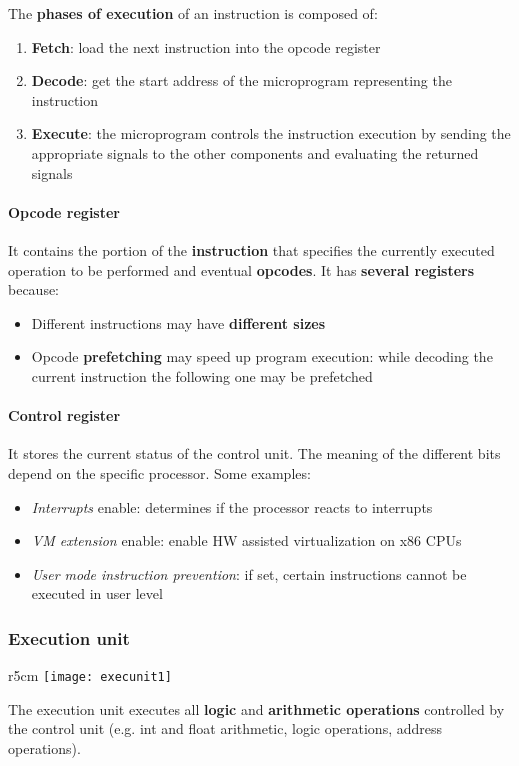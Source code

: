 \noindent The \textbf{phases of execution} of an instruction is composed of:
\begin{enumerate}
	\item \textbf{Fetch}: load the next instruction into the opcode register
	\item \textbf{Decode}: get the start address of the microprogram representing the instruction
	\item \textbf{Execute}: the microprogram controls the instruction execution by sending the appropriate signals to the other components and evaluating the returned signals
\end{enumerate}

\paragraph{Opcode register}
It contains the portion of the \textbf{instruction} that specifies the currently executed operation to be performed and eventual \textbf{opcodes}. It has \textbf{several registers} because:
\begin{itemize}
	\item Different instructions may have \textbf{different sizes}
	\item Opcode \textbf{prefetching} may speed up program execution: while decoding the current instruction the following one may be prefetched
\end{itemize}

\paragraph{Control register}
It stores the current status of the control unit. The meaning of the different bits depend on the specific processor. Some examples:
\begin{itemize}
	\item \textit{Interrupts} enable: determines if the processor reacts to interrupts
	\item \textit{VM extension} enable: enable HW assisted virtualization on x86 CPUs
	\item \textit{User mode instruction prevention}: if set, certain instructions cannot be executed in user level
\end{itemize}

\subsubsection{Execution unit}
\begin{wrapfigure}[8]{r}{5cm}
	\vspace{-0.5cm}
	\texttt{[image: execunit1]}
\end{wrapfigure}
The execution unit executes all \textbf{logic} and \textbf{arithmetic operations} controlled by the control unit (e.g. int and float arithmetic, logic operations, address operations).

